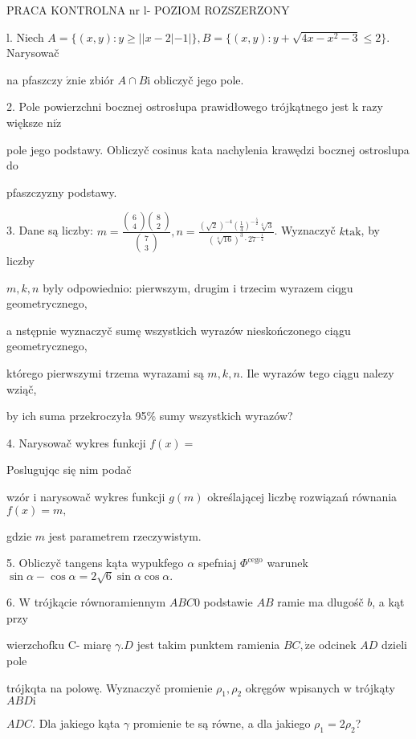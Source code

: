 \documentclass[a4paper,12pt]{article}
\begin{document}
PRACA KONTROLNA nr l- POZIOM ROZSZERZONY

l. Niech $A=\{(x,y):y\geq||x-2|-1|\}, B=\{(x,y):y+\sqrt{4x-x^{2}-3}\leq 2\}$. Narysowač

na pfaszczy $\acute{\mathrm{z}}\mathrm{n}\mathrm{i}\mathrm{e}$ zbiór $A\cap B\mathrm{i}$ obliczyč jego pole.

2. Pole powierzchni bocznej ostrosłupa prawidłowego trójkątnego jest $\mathrm{k}$ razy większe $\mathrm{n}\mathrm{i}\dot{\mathrm{z}}$

pole jego podstawy. Obliczyč cosinus kata nachylenia krawędzi bocznej ostroslupa do

pfaszczyzny podstawy.

3. Dane są liczby: $m = \displaystyle \frac{\left(\begin{array}{l}
6\\
4
\end{array}\right)\left(\begin{array}{l}
8\\
2
\end{array}\right)}{\left(\begin{array}{l}
7\\
3
\end{array}\right)}, n = \displaystyle \frac{(\sqrt{2})^{-4}(\frac{1}{4})^{-\frac{5}{2}}\sqrt[4]{3}}{(\sqrt[4]{16})^{3}\cdot 27^{-\frac{1}{4}}}$. Wyznaczyč $k \mathrm{t}\mathrm{a}\mathrm{k}$, by liczby

$m, k, n$ byly odpowiednio: pierwszym, drugim $\mathrm{i}$ trzecim wyrazem ciqgu geometrycznego,

a nstępnie wyznaczyč sumę wszystkich wyrazów nieskończonego ciągu geometrycznego,

którego pierwszymi trzema wyrazami są $m, k, n$. Ile wyrazów tego ciągu nalezy wziąč,

by ich suma przekroczyła 95\% sumy wszystkich wyrazów?

4. Narysowač wykres funkcji $f(x)=$ 

Poslugujqc się nim podač

wzór $\mathrm{i}$ narysowač wykres funkcji $g(m)$ określającej liczbę rozwiązań równania $f(x)=m,$

gdzie $m$ jest parametrem rzeczywistym.

5. Obliczyč tangens kąta wypukfego $\alpha$ spefniaj $\Phi^{\mathrm{c}\mathrm{e}\mathrm{g}\mathrm{o}}$ warunek $\sin\alpha-\cos\alpha=2\sqrt{6}\sin\alpha\cos\alpha.$

6. $\mathrm{W}$ trójkącie równoramiennym $ABC0$ podstawie $AB$ ramie ma dlugośč $b$, a kąt przy

wierzchofku C- miarę $\gamma. D$ jest takim punktem ramienia $BC, \dot{\mathrm{z}}\mathrm{e}$ odcinek $AD$ dzieli pole

trójkqta na polowę. Wyznaczyč promienie $\rho_{1}, \rho_{2}$ okręgów wpisanych $\mathrm{w}$ trójkąty $ABD\mathrm{i}$

$ADC$. Dla jakiego kąta $\gamma$ promienie te są równe, a dla jakiego $\rho_{1}=2\rho_{2}$?
\end{document}
